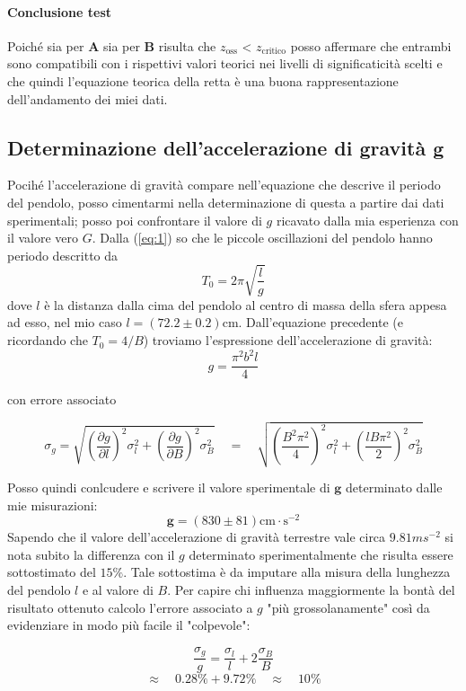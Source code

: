 \documentclass{article}
\begin{document}
	\paragraph{Conclusione test} Poiché sia per $\mathbf{A}$ sia per $\mathbf{B}$ risulta che $z_{\text{oss}}$ < $z_{\text{critico}}$ posso affermare che entrambi sono compatibili con i rispettivi valori teorici nei livelli di significaticità scelti e che quindi l'equazione teorica della retta è una buona rappresentazione dell'andamento dei miei dati.
	
	\subsection{Determinazione dell'accelerazione di gravità g}
	Pocihé l'accelerazione di gravità compare nell'equazione che descrive il periodo del pendolo, posso cimentarmi nella determinazione di questa a partire dai dati sperimentali; posso poi confrontare il valore di $g$ ricavato dalla mia esperienza con il valore vero $G$. Dalla (\ref{eq:1}) so che le piccole oscillazioni del pendolo hanno periodo descritto da
	\[
	T_0 = 2\pi \sqrt{\frac{l}{g}} 
	\]
	dove $l$ è la distanza dalla cima del pendolo al centro di massa della sfera appesa ad esso, nel mio caso $l = (72.2 \pm 0.2)$cm. Dall'equazione precedente (e ricordando che $T_0 = 4/B$) troviamo l'espressione dell'accelerazione di gravità:
	\[
	g = \frac{\pi^2b^2l}{4}
	\]
	
	con errore associato
	
	\[
	\sigma_g = \sqrt{\left(\frac{\partial g}{\partial l} \right)^2\sigma_l^2 + \left(\frac{\partial g}{\partial B} \right)^2 \sigma_B^2}  \quad = \quad 	\sqrt{\left(\frac{B^2\pi^2}{4}\right)^2 \sigma_l^2 + \left( \frac{lB\pi^2}{2}  \right)^2 \sigma_B^2}	 
	\]
	
	
	\noindent
	Posso quindi conlcudere e scrivere il valore sperimentale di $\mathbf{g}$ determinato dalle mie misurazioni:
	\[
	\mathbf{g} = (830 \pm 81)\text{cm}\cdot \text{s}^{-2}
	\]
	\noindent
	Sapendo che il valore dell'accelerazione di gravità terrestre vale circa $9.81ms^{-2}$ si nota subito la differenza con il $g$ determinato sperimentalmente che risulta essere sottostimato del $15\%$. Tale sottostima è da imputare alla misura della lunghezza del pendolo $l$ e al valore di $B$.  Per capire chi influenza maggiormente la bontà del risultato ottenuto calcolo l'errore associato a $g$ "più grossolanamente" così da evidenziare in modo più facile il "colpevole":
	
	\[
	\frac{\sigma_g}{g} = \frac{\sigma_l}{l} + 2\frac{\sigma_B}{B} 
	\]
	\[
	\approx \quad 0.28 \% + 9.72 \% \quad \approx  \quad 10\%	
	\]
	
\end{document}
